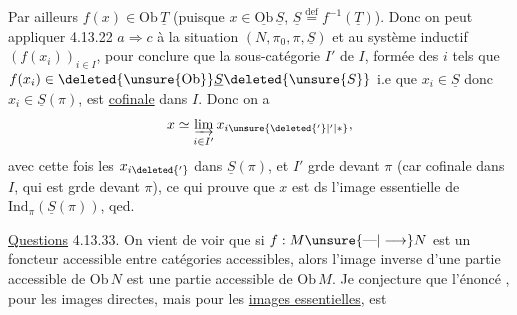 Par ailleurs $f(x)\in\mathrm{Ob}\,\underline T$ (puisque $x\in\underline{\mathrm{Ob}}\,\underline S$,  $\underline S\overset{\mathrm{def}}{=}f^{-1}(\underline T)$). Donc on peut appliquer 4.13.22 $a\Longrightarrow c$ à la situation $(N,\pi_0,\pi,\underline S)$ et au système inductif $(f(x_i))_{i\in I}$, pour conclure que la sous-catégorie $I'$ de $I$, formée des $i$ tels que $f(x_i)\in\deleted{\unsure{\mathrm{Ob}}}\underline S\deleted{\unsure{S}}$ i.e  que $x_i\in\underline S$ donc $x_i\in\underline S(\pi)$, est \uline{cofinale} dans $I$. Donc on a
\[
x\simeq\underset{i\in I'}{\underrightarrow{\lim}}\,x_{i\unsure{\deleted{{}'}|{}'|\ast}},
\]
avec cette fois les $x_{i\deleted{{}'}}$ dans $\underline S(\pi)$, et $I'$ grde devant $\pi$ (car cofinale  dans $I$, qui est grde devant $\pi$), ce qui prouve que $x$ est ds l'image essentielle de $\mathrm{Ind}_\pi(\underline S(\pi))$, qed.

\uline{Questions} 4.13.33. On vient de voir que si $f:M\unsure{\text{---}|\longrightarrow}N$ est un foncteur accessible entre catégories accessibles, alors l'image inverse d'une  partie accessible de $\mathrm{Ob}\,N$ est une partie accessible de $\mathrm{Ob}\,M$.
Je conjecture que l'énoncé ,  pour les images directes, mais pour les \uline{images essentielles}, est
